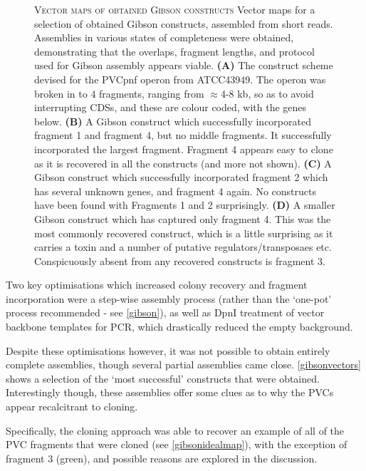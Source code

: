 \begin{figure}[p]
    \captionsetup{singlelinecheck=off, justification=justified, font=footnotesize, aboveskip=10pt}
    \caption[Gibson constructs obtained]{\textsc{\normalsize Vector maps of obtained Gibson constructs} \vspace{0.1cm} \newline Vector maps for a selection of obtained Gibson constructs, assembled from short reads. Assemblies in various states of completeness were obtained, demonstrating that the overlaps, fragment lengths, and protocol used for Gibson assembly appears viable. \textbf{(A)} The construct scheme devised for the PVCpnf operon from ATCC43949. The operon was broken in to 4 fragments, ranging from $\approx$4-8 kb, so as to avoid interrupting CDSs, and these are colour coded, with the genes below. \textbf{(B)} A Gibson construct which successfully incorporated {\color{red}fragment 1} and {\color{gray}fragment 4}, but no middle fragments. It successfully incorporated the largest fragment. Fragment 4 appears easy to clone as it is recovered in all the constructs (and more not shown). \textbf{(C)} A Gibson construct which successfully incorporated {\color{orange}fragment 2} which has several unknown genes, and {\color{gray}fragment 4} again. No constructs have been found with Fragments 1 and 2 surprisingly. \textbf{(D)} A smaller Gibson construct which has captured only {\color{gray}fragment 4}. This was the most commonly recovered construct, which is a little surprising as it carries a toxin and a number of putative regulators/transposaes etc. Conspicuously absent from any recovered constructs is {\color{Green}fragment 3}.}
\label{gibsonvectors}
\end{figure}


Two key optimisations which increased colony recovery and fragment incorporation were a step-wise assembly process (rather than the `one-pot' process recommended - see \vref{gibson}), as well as DpnI treatment of vector backbone templates for PCR, which drastically reduced the empty background.


Despite these optimisations however, it was not possible to obtain entirely complete assemblies, though several partial assemblies came close. \vref{gibsonvectors} shows a selection of the `most successful' constructs that were obtained. Interestingly though, these assemblies offer some clues as to why the PVCs appear recalcitrant to cloning.

Specifically, the cloning approach was able to recover an example of all of the PVC fragments that were cloned (see \vref{gibsonidealmap}), with the exception of fragment 3 (green), and possible reasons are explored in the discussion.


